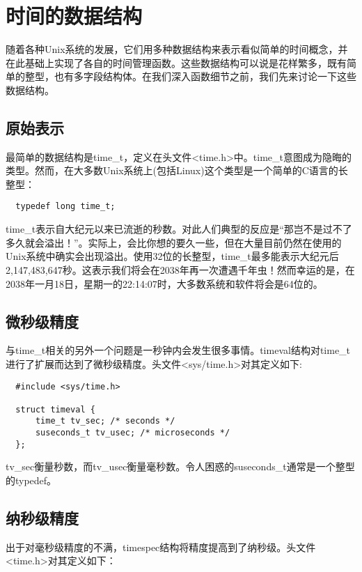 \section{时间的数据结构}

随着各种Unix系统的发展，它们用多种数据结构来表示看似简单的时间概念，并在此基础上实现了各自的时间管理函数。这些数据结构可以说是花样繁多，既有简单的整型，也有多字段结构体。在我们深入函数细节之前，我们先来讨论一下这些数据结构。 

\subsection{原始表示}

最简单的数据结构是time\_t，定义在头文件<time.h>中。time\_t意图成为隐晦的类型。然而，在大多数Unix系统上(包括Linux)这个类型是一个简单的C语言的长整型： 

\begin{lstlisting}
  typedef long time_t;
\end{lstlisting}

time\_t表示自大纪元以来已流逝的秒数。对此人们典型的反应是“那岂不是过不了多久就会溢出！”。实际上，会比你想的要久一些，但在大量目前仍然在使用的Unix系统中确实会出现溢出。使用32位的长整型，time\_t最多能表示大纪元后2,147,483,647秒。这表示我们将会在2038年再一次遭遇千年虫！然而幸运的是，在2038年一月18日，星期一的22:14:07时，大多数系统和软件将会是64位的。

\subsection{微秒级精度}

与time\_t相关的另外一个问题是一秒钟内会发生很多事情。timeval结构对time\_t进行了扩展而达到了微秒级精度。头文件<sys/time.h>对其定义如下: 

\begin{lstlisting}
  #include <sys/time.h>

  struct timeval {
      time_t tv_sec; /* seconds */
      suseconds_t tv_usec; /* microseconds */
  };  
\end{lstlisting}

tv\_sec衡量秒数，而tv\_usec衡量毫秒数。令人困惑的suseconds\_t通常是一个整型的typedef。 

\subsection{纳秒级精度}

出于对毫秒级精度的不满，timespec结构将精度提高到了纳秒级。头文件<time.h>对其定义如下： 

